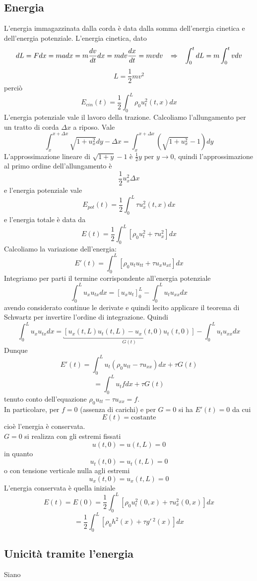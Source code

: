 \subsection{Energia}
L'energia immagazzinata dalla corda \`e data dalla somma dell'energia cinetica
e dell'energia potenziale. L'energia cinetica, dato
\[
	dL=Fdx=madx=m\frac{dv}{dt}dx=mdv\frac{dx}{dt}=mvdv
	\;\;\; \Rightarrow \;\;\;
	\int_0^t dL= m \int_0^t vdv
\]
\[
	L=\frac{1}{2}mv^2
\]
perci\`o
\[
	E_{cin}(t)= \frac{1}{2}\int_0^L \rho_0 u^2_t(t,x)dx
\]
L'energia potenziale vale il lavoro della trazione.
Calcoliamo l'allungamento per un tratto di corda $\Delta x$ a riposo. Vale
\[
	\int_x^{x + \Delta x} \sqrt{1+ u^2_x} dy - \Delta x= 
	\int_x^{x + \Delta x} \left( \sqrt{1+ u^2_x}-1 \right) dy
\]
L'approssimazione lineare di $\sqrt{1+y}-1$ \`e $\frac{1}{2}y$ per $y \to 0$,
quindi l'approssimazione al primo ordine dell'allungamento \`e
\[
	\frac{1}{2} u^2_x \Delta x
\]
e l'energia potenziale vale
\[
	E_{pot}(t)= \frac{1}{2} \int_0^L \tau u^2_x (t,x)dx
\]
e l'energia totale \`e data da
\[
	E(t)= \frac{1}{2}\int_0^L \left[
	\rho_0 u^2_t + \tau u_x^2
	\right] dx
\]
Calcoliamo la variazione dell'energia:
\[
	E'(t)= \int_0^L \left[
	\rho_0 u_t u_{tt} + \tau u_x u_{xt}
	\right] dx
\]
Integriamo per parti il termine corrispondente all'energia potenziale
\[
	\int_0^L u_x u_{tx}dx= 
	\left[ u_x u_t \right]_0^L -
	\int_0^L u_t u_{xx} dx
\]
avendo considerato continue le derivate e quindi lecito applicare il 
teorema di Schwartz per invertire l'ordine di integrazione. Quindi
\[
	\int_0^L u_x u_{tx}dx= 
	\underbracket{\left[ u_x(t,L) u_t(t,L) -  u_x(t,0) u_t(t,0) \right]}_{
	G(t)} -
	\int_0^L u_t u_{xx} dx
\]
Dunque
\[
	E'(t)= \int_0^L u_t (\rho_0 u_{tt} - \tau u_{xx})dx + \tau G(t)
\]
\[
	= \int_0^L u_t f dx + \tau G(t)
\]
tenuto conto dell'equazione $\rho_0 u_{tt} - \tau u_{xx}= f$.\\
In particolare, per $f=0$ (assenza di carichi) e per $G=0$ si ha $E'(t)=0$
da cui
\[
	E(t)= \text{costante}
\]
cio\`e l'energia \`e conservata.\\
$G=0$ si realizza con gli estremi fissati
\[
	u(t,0)=u(t,L)=0
\]
in quanto
\[
	u_t(t,0)=u_t(t,L)=0
\]
o con tensione verticale nulla agli estremi
\[
	u_x(t,0)=u_x(t,L)=0
\]
L'energia conservata \`e quella iniziale
\[
	E(t)=E(0)=\frac{1}{2}\int_0^L
	\left[
	\rho_0 u_t^2 (0,x) + \tau u^2_x (0,x)
	\right]dx
\]
\[
	=\frac{1}{2}\int_0^L
	\left[
	\rho_0 h^2(x) + \tau g'\,^2(x)
	\right]dx
\]
\subsection{Unicit\`a tramite l'energia}
Siano
